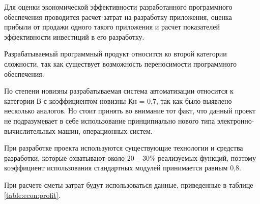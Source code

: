 Для оценки экономической эффективности разработанного программного обеспечения проводится расчет затрат на разработку приложения, оценка прибыли от продажи одного такого приложения и расчет показателей эффективности инвестиций в его разработку.

Разрабатываемый программный продукт относится ко второй категории сложности, так как существует возможность переносимости программного обеспечения.

По степени новизны разрабатываемая система автоматизации относится к категории В с коэффициентом новизны Кн = 0,7, так как было выявлено несколько аналогов. Но стоит принять во внимание тот факт, что данный проект не подразумевает в себе использование принципиально нового типа электронно-вычислительных машин, операционных систем.

При разработке проекта используются существующие технологии и средства разработки, которые охватывают около 20 – 30\% реализуемых функций, поэтому коэффициент использования стандартных модулей принимается равным 0,8.

При расчете сметы затрат будут использоваться данные, приведенные в таблице \ref{table:econ:profit}.


